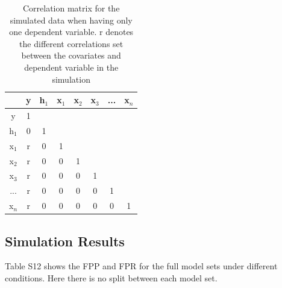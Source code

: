 \begin{table}[H]
\caption{}
\centering
\caption*{Correlation matrix for the simulated data when having only one dependent variable. r denotes the different correlations set between the covariates and dependent variable in the simulation}
\begin{tabular}{c|ccccccc} 
\toprule
 & y & h${}_{1}$ & x${}_{1}$ & x${}_{2}$ & x${}_{3}$ & ... & x${}_{n}$ \\ 
 \midrule
y & 1 &  &  &  &  &  &  \\ 
h${}_{1}$ & 0 & 1 &  &  &  &  &  \\ 
x${}_{1}$ & r & 0 & 1 &  &  &  &  \\  
x${}_{2}$ & r & 0 & 0 & 1 &  &  &  \\  
x${}_{3}$ & r & 0 & 0 & 0 & 1 &  &  \\  
... & r & 0 & 0 & 0 & 0 & 1 &  \\ 
x${}_{n}$ & r & 0 & 0 & 0 & 0 & 0 & 1 \\ 
\bottomrule
\end{tabular}
\end{table}

\subsection{Simulation Results}
Table S12 shows the FPP and FPR for the full model sets under different conditions. Here there is no split between each model set.




